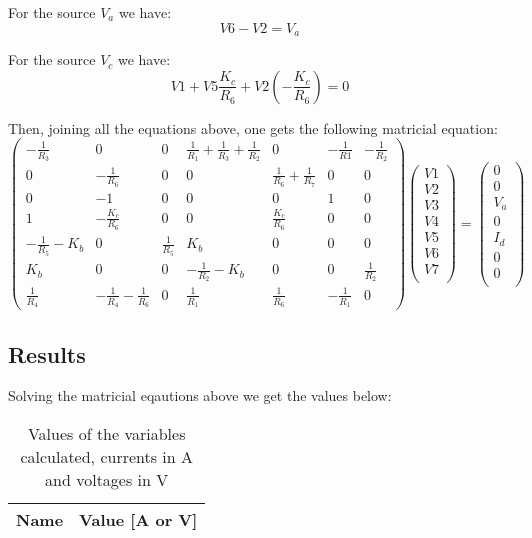 For the source $V_a$ we have:
\begin{equation}
  V6-V2=V_a
\end{equation}

For the source $V_c$ we have:
\begin{equation}
  V1+V5\frac{K_c}{R_6}+V2(-\frac{K_c}{R_6})=0
  \end{equation}

Then, joining all the equations above, one gets the following matricial equation:
\begin{equation}
\begin{pmatrix}
  -\frac{1}{R_3} & 0 & 0 & \frac{1}{R_1}+\frac{1}{R_3}+\frac{1}{R_2} & 0 & -\frac{1}{R1} & -\frac{1}{R_2} \\
  0 & -\frac{1}{R_6} & 0 & 0 & \frac{1}{R_6}+\frac{1}{R_7} & 0 & 0 \\
  0 & -1 & 0 & 0 & 0 & 1 & 0 \\
  1 & -\frac{K_c}{R_6} & 0 & 0 & \frac{K_c}{R_6} & 0 & 0 \\
  -\frac{1}{R_5}-K_b & 0 & \frac{1}{R_5} & K_b & 0 & 0 & 0 \\
  K_b & 0 & 0 & -\frac{1}{R_2}-K_b & 0 & 0 & \frac{1}{R_2} \\
  \frac{1}{R_4} & -\frac{1}{R_4}-\frac{1}{R_6} & 0 & \frac{1}{R_1} & \frac{1}{R_6} & -\frac{1}{R_1} & 0
\end{pmatrix}
\begin{pmatrix}
  V1  \\
  V2  \\
  V3  \\
  V4  \\
  V5  \\
  V6  \\
  V7  \\
\end{pmatrix}
=
\begin{pmatrix}
  0   \\
  0   \\
  V_a  \\
  0    \\
  I_d  \\
  0    \\
  0    \\
\end{pmatrix}
  \end{equation}


\subsection{Results}
Solving the matricial eqautions above we get the values below:
\begin{table}[H]
  \centering
  \begin{tabular}{|l|r|}
    \hline
     {\bf Name} & {\bf Value [A or V]} \\ \hline
    
  \end{tabular}
  \caption{Values of the variables calculated, currents in A and voltages in V}
  \label{tab1}
\end{table}



